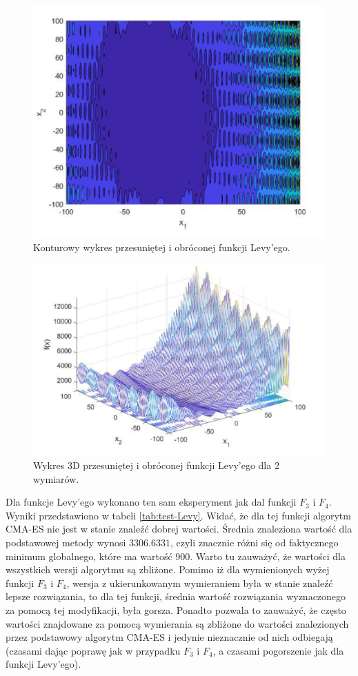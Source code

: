 \documentclass[10pt]{article}
\begin{document}
\begin{figure}[H]
\centering
\includegraphics[scale=1]{images/kontur-levy.png}
\caption{Konturowy wykres przesuniętej i obróconej funkcji Levy'ego.}
\end{figure}
\begin{figure}[H]
\centering
\includegraphics[scale=1]{images/3D-Levy.png}
\caption{Wykres 3D przesuniętej i obróconej funkcji Levy'ego dla 2 wymiarów.}
\end{figure}
Dla funkcje Levy'ego wykonano ten sam eksperyment jak dal funkcji $F_3$ i $F_4$. Wyniki przedstawiono w tabeli \ref{tab:test-Levy}. Widać, że dla tej funkcji algorytm CMA-ES nie jest w stanie znaleźć dobrej wartości. Średnia znaleziona wartość dla podstawowej metody wynosi $3306.6331$, czyli znacznie różni się od faktycznego minimum globalnego, które ma wartość 900. Warto tu zauważyć, że wartości dla wszystkich wersji algorytmu są zbliżone. Pomimo iż dla wymienionych wyżej funkcji $F_3$ i $F_4$, wersja z ukierunkowanym wymieraniem była w stanie znaleźć lepsze rozwiązania, to dla tej funkcji, średnia wartość rozwiązania wyznaczonego za pomocą tej modyfikacji, była gorsza. Ponadto pozwala to zauważyć, że często wartości znajdowane za pomocą wymierania są zbliżone do wartości znalezionych przez podstawowy algorytm CMA-ES i jedynie nieznacznie od nich odbiegają (czasami dając poprawę jak w przypadku $F_3$ i $F_4$, a czasami pogorszenie jak dla funkcji Levy'ego).
\end{document}
